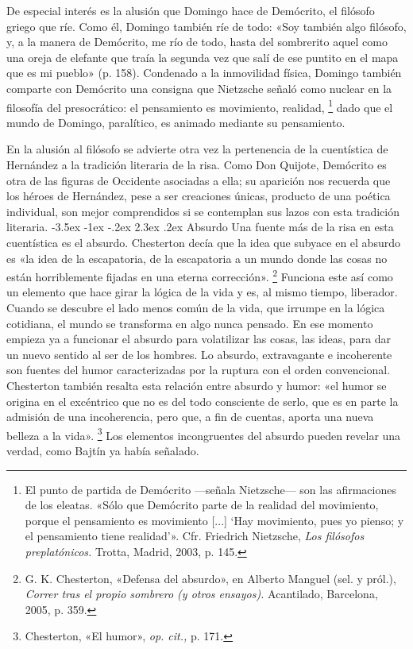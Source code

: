\documentclass[14pt,twoside,final]{extbook} %
\makeatletter
\let\oldfootnote\footnote
\renewcommand\footnote[1]{%
\oldfootnote{\hspace{1mm}#1}}
\renewcommand\section{\@startsection {section}{1}{\z@}%
                                     {-3.5ex \@plus -1ex \@minus -.2ex}%
                                     {2.3ex \@plus .2ex}%
                                     {\normalfont\large\bfseries\sc}}
\makeatother
\begin{document}
De especial interés es la alusión que Domingo hace de Demócrito, el filósofo griego que ríe. Como él, Domingo también ríe de todo: «Soy también algo filósofo, y, a la manera de Demócrito, me río de todo, hasta del sombrerito aquel como una oreja de elefante que traía la segunda vez que salí de ese puntito en el mapa que es mi pueblo» (p. 158). Condenado a la inmovilidad física, Domingo también comparte con Demócrito una consigna que Nietzsche señaló como nuclear en la filosofía del presocrático: el pensamiento es movimiento, realidad,\footnote{El punto de partida de Demócrito ---señala Nietzsche--- son las afirmaciones de los eleatas. «Sólo que Demócrito parte de la realidad del movimiento, porque el pensamiento es movimiento [...] `Hay movimiento, pues yo pienso; y el pensamiento tiene realidad'». Cfr. Friedrich Nietzsche, \emph{Los filósofos preplatónicos.} Trotta, Madrid, 2003, p. 145.} dado que el mundo de Domingo, paralítico, es animado mediante su pensamiento.

En la alusión al filósofo se advierte otra vez la pertenencia de la cuentística de Hernández a la tradición literaria de la risa. Como Don Quijote, Demócrito es otra de las figuras de Occidente asociadas a ella; su aparición nos recuerda que los héroes de Hernández, pese a ser creaciones únicas, producto de una poética individual, son mejor comprendidos si se contemplan sus lazos con esta tradición literaria.
\section{Absurdo}\label{sec:absurdo}
Una fuente más de la risa en esta cuentística es el absurdo. Chesterton decía que la idea que subyace en el absurdo es «la idea de la escapatoria, de la escapatoria a un mundo donde las cosas no están horriblemente fijadas en una eterna corrección».\footnote{G. K. Chesterton, «Defensa del absurdo», en Alberto Manguel (sel. y pról.), \emph{Correr tras el propio sombrero (y otros ensayos).} Acantilado, Barcelona, 2005, p. 359.} Funciona este así como un elemento que hace girar la lógica de la vida y es, al mismo tiempo, liberador. Cuando se descubre el lado menos común de la vida, que irrumpe en la lógica cotidiana, el mundo se transforma en algo nunca pensado. En ese momento empieza ya a funcionar el absurdo para volatilizar las cosas, las ideas, para dar un nuevo sentido al ser de los hombres. Lo absurdo, extravagante e incoherente son fuentes del humor caracterizadas por la ruptura con el orden convencional. Chesterton también resalta esta relación entre absurdo y humor: «el humor se origina en el excéntrico que no es del todo consciente de serlo, que es en parte la admisión de una incoherencia, pero que, a fin de cuentas, aporta una nueva belleza a la vida».\footnote{Chesterton, «El humor», \emph{op. cit.,} p. 171.} Los elementos incongruentes del absurdo pueden revelar una verdad, como Bajtín ya había señalado.
\end{document}
